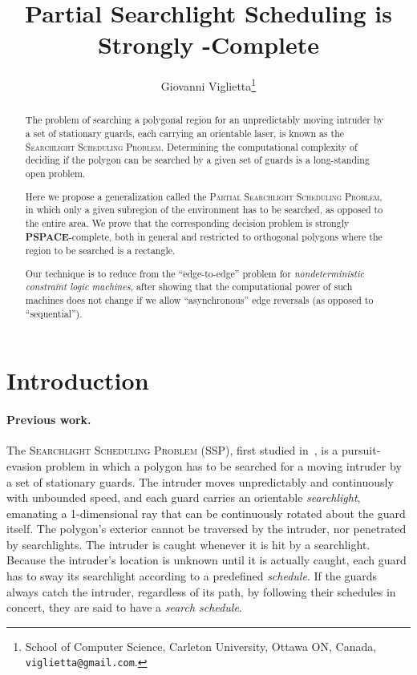 \documentclass{style}
\title{Partial Searchlight Scheduling is Strongly \PSPACE-Complete}
\author{Giovanni Viglietta\thanks{School of Computer Science, Carleton University, Ottawa ON, Canada, {\tt viglietta@gmail.com}.}}
\newcommand{\complexityclass}[1]{\textbf{#1}}
\newcommand{\computproblem}[1]{\textsc{#1}}
\newcommand{\PSPACE}{\complexityclass{PSPACE}\xspace}
\newcommand{\SSP}{\computproblem{SSP}\xspace}
\begin{document}
\thispagestyle{empty}
\maketitle

\begin{abstract}
The problem of searching a polygonal region for an unpredictably moving intruder by a set of stationary guards, each carrying an orientable laser, is known as the \computproblem{Searchlight Scheduling Problem}. Determining the computational complexity of deciding if the polygon can be searched by a given set of guards is a long-standing open problem.

Here we propose a generalization called the \computproblem{Partial Searchlight Scheduling Problem}, in which only a given subregion of the environment has to be searched, as opposed to the entire area. We prove that the corresponding decision problem is strongly \PSPACE-complete, both in general and restricted to orthogonal polygons where the region to be searched is a rectangle.

Our technique is to reduce from the ``edge-to-edge'' problem for \emph{nondeterministic constraint logic machines}, after showing that the computational power of such machines does not change if we allow ``asynchronous'' edge reversals (as opposed to ``sequential'').
\end{abstract}

\section{Introduction} \label{sectionintro}

\paragraph{Previous work.}

The \computproblem{Searchlight Scheduling Problem} (\SSP), first studied in~\cite{search}, is a pursuit-evasion problem in which a polygon has to be searched for a moving intruder by a set of stationary guards. The intruder moves unpredictably and continuously with unbounded speed, and each guard carries an orientable \emph{searchlight}, emanating a 1-dimensional ray that can be continuously rotated about the guard itself. The polygon's exterior cannot be traversed by the intruder, nor penetrated by searchlights. The intruder is caught whenever it is hit by a searchlight. Because the intruder's location is unknown until it is actually caught, each guard has to sway its searchlight according to a predefined \emph{schedule}. If the guards always catch the intruder, regardless of its path, by following their schedules in concert, they are said to have a \emph{search schedule}.
\end{document}
